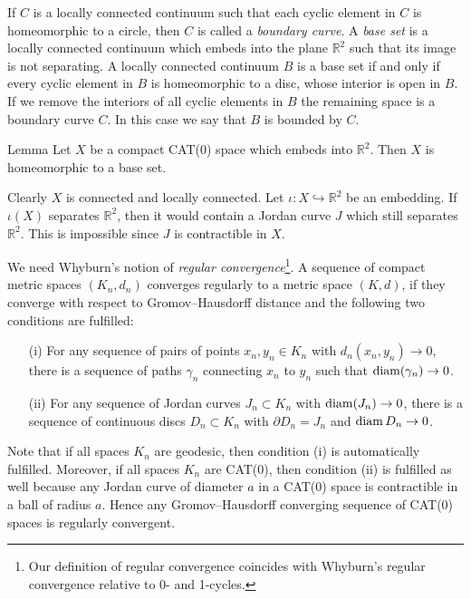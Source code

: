 \documentclass[a4paper,10pt]{amsart}
\begin{document}
If $C$ is a locally connected continuum such that 
each cyclic element in $C$ is homeomorphic to a circle, then $C$ is
called a {\em boundary curve}. A {\em base set} is a locally connected continuum which
embeds into the plane $\mathbb{R}^2$ such that its image is not separating. A locally connected
continuum $B$ is a base set if and only if every cyclic element in $B$ is homeomorphic to a disc,
whose interior is open in $B$. If we remove the interiors of all cyclic elements in $B$ the remaining
space is a boundary curve $C$. In this case we say that $B$ is bounded by $C$.


\begin{thm}{Lemma}
 Let $X$ be a compact CAT(0) space which embeds into $\mathbb{R}^2$. Then $X$
 is homeomorphic to a base set.
\end{thm}

Clearly $X$ is connected and locally connected. Let $\iota :X\hookrightarrow\mathbb{R}^2$ be an embedding.
If $\iota(X)$ separates $\mathbb{R}^2$, then it would contain a Jordan curve $J$ which still separates
$\mathbb{R}^2$. This is impossible since $J$ is contractible in $X$.
\qeds

We need Whyburn's notion of {\em regular convergence}\footnote{Our definition of regular convergence coincides with Whyburn's regular convergence relative
to 0- and 1-cycles.}. A sequence of compact metric spaces $(K_n,d_n)$ converges regularly to a 
metric space $(K,d)$, if they converge with respect to Gromov--Hausdorff distance and the following two conditions are fulfilled:
\begin{itemize}
 \item[(i)] For any sequence of pairs of points $x_n,y_n\in K_n$ with $d_n(x_n,y_n)\to 0$, there is a sequence of paths $\gamma_n$
 connecting $x_n$ to $y_n$ such that $\mathop{\rm diam}\nolimits(\gamma_n)\to 0$.
 \item[(ii)] For any sequence of Jordan curves $J_n\subset K_n$ with $\mathop{\rm diam}\nolimits(J_n)\to 0$, there is a sequence of continuous discs $D_n\subset K_n$
 with $\partial D_n=J_n$ and $\mathop{\rm diam}\nolimits D_n\to 0$. 
\end{itemize}

Note that if all spaces $K_n$ are geodesic, then condition (i) is automatically fulfilled. Moreover, if all 
spaces $K_n$ are CAT(0), then condition (ii) is fulfilled as well because any Jordan curve of diameter $a$ in a CAT(0)
space is contractible in a ball of radius $a$. Hence any Gromov--Hausdorff converging sequence of CAT(0) spaces is 
regularly convergent.
\end{document}
